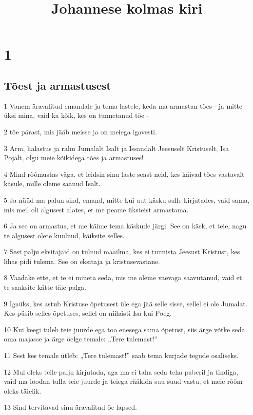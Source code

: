 

\title{Johannese kolmas kiri}

\chapter{1}

\section*{Tõest ja armastusest}

\par 1 Vanem äravalitud emandale ja tema lastele, keda ma armastan tões - ja mitte üksi mina, vaid ka kõik, kes on tunnetanud tõe -
\par 2 tõe pärast, mis jääb meisse ja on meiega igavesti.
\par 3 Arm, halastus ja rahu Jumalalt Isalt ja Issandalt Jeesuselt Kristuselt, Isa Pojalt, olgu meie kõikidega tões ja armastuses!
\par 4 Mind rõõmustas väga, et leidsin sinu laste seast neid, kes käivad tões vastavalt käsule, mille oleme saanud Isalt.
\par 5 Ja nüüd ma palun sind, emand, mitte kui uut käsku sulle kirjutades, vaid sama, mis meil oli algusest alates, et me peame üksteist armastama.
\par 6 Ja see on armastus, et me käime tema käskude järgi. See on käsk, et teie, nagu te algusest olete kuulnud, käiksite selles.
\par 7 Sest palju eksitajaid on tulnud maailma, kes ei tunnista Jeesust Kristust, kes lihas pidi tulema. See on eksitaja ja kristusevastane.
\par 8 Vaadake ette, et te ei mineta seda, mis me oleme vaevaga saavutanud, vaid et te saaksite kätte täie palga.
\par 9 Igaüks, kes astub Kristuse õpetusest üle ega jää selle sisse, sellel ei ole Jumalat. Kes püsib selles õpetuses, sellel on niihästi Isa kui Poeg.
\par 10 Kui keegi tuleb teie juurde ega too enesega sama õpetust, siis ärge võtke seda oma majasse ja ärge öelge temale: „Tere tulemast!”
\par 11 Sest kes temale ütleb: „Tere tulemast!” saab tema kurjade tegude osaliseks.
\par 12 Mul oleks teile palju kirjutada, aga ma ei taha seda teha paberil ja tindiga, vaid ma loodan tulla teie juurde ja teiega rääkida suu suud vastu, et meie rõõm oleks täielik.
\par 13 Sind tervitavad sinu äravalitud õe lapsed.



